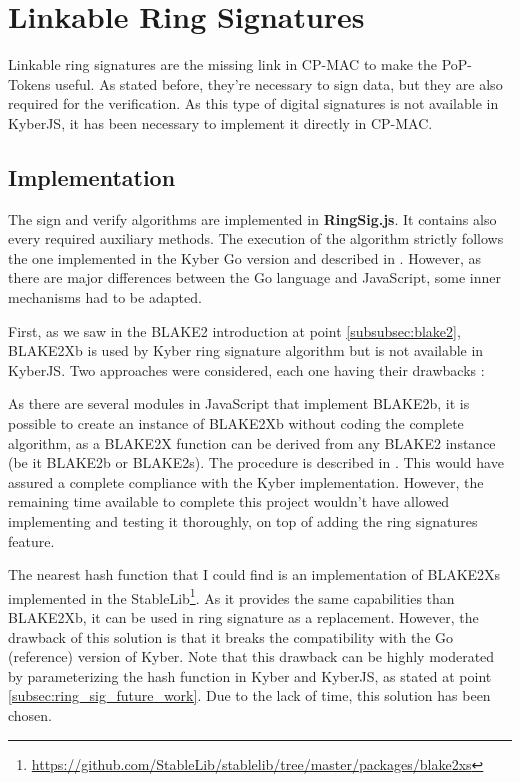 \section{Linkable Ring Signatures}
\label{sec:linkable_ring_signature}
Linkable ring signatures are the missing link in CP-MAC to make the PoP-Tokens useful. As stated before, they're necessary to sign data, but they are also required for the verification.  As this type of digital signatures is not available in KyberJS, it has been necessary to implement it directly in CP-MAC.

\subsection{Implementation}
The sign and verify algorithms are implemented in \textbf{RingSig.js}. It contains also every required auxiliary methods. The execution of the algorithm strictly follows the one implemented in the Kyber Go version and described in \cite{cryptoeprint:2004:027}.  However, as there are major differences between the Go language and JavaScript, some inner mechanisms had to be adapted.

First, as we saw in the BLAKE2 introduction at point \ref{subsubsec:blake2}, BLAKE2Xb is used by Kyber ring signature algorithm but is not available in KyberJS. Two approaches were considered, each one having their drawbacks :

\begin{description}[style=nextline]
	\item[Implement BLAKE2Xb for CP-MAC] As there are several modules in JavaScript that implement BLAKE2b, it is possible to create an instance of BLAKE2Xb without coding the complete algorithm, as a BLAKE2X function can be derived from any BLAKE2 instance (be it BLAKE2b or BLAKE2s). The procedure is described in \cite{aumasson2016blake2x}. This would have assured a complete compliance with the Kyber implementation. However, the remaining time available to complete this project wouldn't have allowed imple\-menting and testing it thoroughly, on top of adding the ring signatures feature.
	\item[Use another hash function] The nearest hash function that I could find is an implementation of BLAKE2Xs implemented in the StableLib\footnote{\url{https://github.com/StableLib/stablelib/tree/master/packages/blake2xs}}. As it provides the same capabilities than BLAKE2Xb, it can be used in ring signature as a replacement. However, the drawback of this solution is that it breaks the compatibility with the Go (reference) version of Kyber. Note that this drawback can be highly moderated by parameterizing the hash function in Kyber and KyberJS, as stated at point \ref{subsec:ring_sig_future_work}. Due to the lack of time, this solution has been chosen. 
\end{description}


